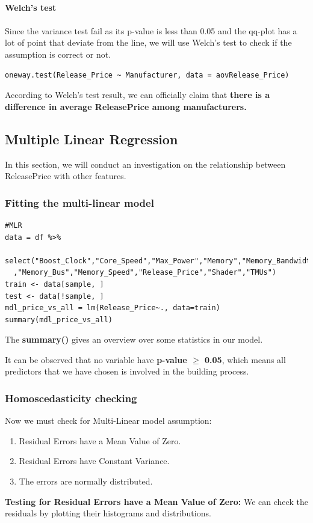 \documentclass[a4paper]{article}
\let\ge=\geq
\theoremstyle{definition}
\begin{document}
\\
\textbf{Welch's test}\\
\\
Since the variance test fail as its p-value is less than 0.05 and the qq-plot has a lot of point that deviate from the line, we will use Welch's test to check if the assumption is correct or not.
\begin{mdframed}[leftline=false,rightline=false,backgroundcolor=lightblue!10,nobreak=false]
    \begin{verbatim}
oneway.test(Release_Price ~ Manufacturer, data = aovRelease_Price)
    \end{verbatim}
\end{mdframed}

According to Welch's test result, we can officially claim that \textbf{there is a difference in average Release\textunderscore Price among manufacturers.}

\subsection{Multiple Linear Regression}
In this section, we will conduct an investigation on the relationship between Release\textunderscore Price with other features.
\subsubsection{Fitting the multi-linear model}
\begin{mdframed}[leftline=false,rightline=false,backgroundcolor=lightblue!10,nobreak=false]
    \begin{verbatim}
#MLR
data = df %>%
  select("Boost_Clock","Core_Speed","Max_Power","Memory","Memory_Bandwidth"
  ,"Memory_Bus","Memory_Speed","Release_Price","Shader","TMUs")
train <- data[sample, ]
test <- data[!sample, ]
mdl_price_vs_all = lm(Release_Price~., data=train)
summary(mdl_price_vs_all)
    \end{verbatim}
\end{mdframed}
The \textbf{summary()} gives an overview over some statistics in our model.

It can be observed that no variable have \textbf{p-value $\ge$ 0.05}, which means all predictors that we have chosen is involved in the building process.
\subsubsection{Homoscedasticity checking}
Now we must check for Multi-Linear model assumption: 
\begin{enumerate}
    \item Residual Errors have a Mean Value of Zero.
    \item Residual Errors have Constant Variance.
    \item The errors are normally distributed.
\end{enumerate}
\textbf{Testing for Residual Errors have a Mean Value of Zero:} We can check the residuals by plotting their histograms and distributions.
\end{document}
